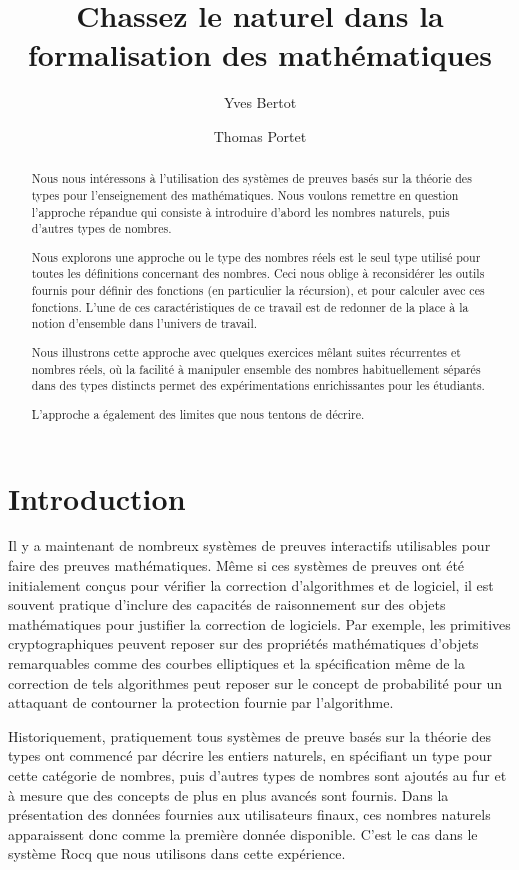 \documentclass[draft]{jflart}
\title{Chassez le naturel dans la formalisation des mathématiques}
\author[1]{Yves Bertot}
\author[1]{Thomas Portet}
\affil[1]{Centre Inria de l'Université Côte d'Azur, France}
\begin{document}
\maketitle

\begin{abstract}
  Nous nous intéressons à l'utilisation des systèmes de preuves basés sur la
  théorie des types pour l'enseignement des mathématiques.  Nous voulons
  remettre en question l'approche répandue qui consiste à introduire
  d'abord les nombres naturels, puis d'autres types de nombres.

  Nous explorons une approche ou le type des nombres réels est le seul type
  utilisé pour toutes les définitions concernant des nombres.  Ceci nous oblige
  à reconsidérer les outils fournis pour définir des fonctions (en particulier
  la récursion), et pour calculer avec ces fonctions.
  L'une de ces caractéristiques de ce travail est de redonner de la place à
  la notion d'ensemble dans l'univers de travail.

  Nous illustrons cette approche avec quelques exercices mêlant suites
  récurrentes et nombres réels, où la facilité à manipuler ensemble des nombres
  habituellement séparés dans des types distincts permet des expérimentations
  enrichissantes pour les étudiants.

  L'approche a également des limites que nous tentons de décrire.
\end{abstract}

\section{Introduction}

Il y a maintenant de nombreux systèmes de preuves interactifs
utilisables pour faire des preuves mathématiques.  Même si ces
systèmes de preuves ont été initialement conçus pour vérifier la
correction d'algorithmes et de logiciel, il est souvent pratique
d'inclure des capacités de raisonnement sur des objets mathématiques
pour justifier la correction de logiciels.  Par exemple, les
primitives cryptographiques peuvent reposer sur des propriétés
mathématiques d'objets remarquables comme des courbes elliptiques et
la spécification même de la correction de tels algorithmes peut
reposer sur le concept de probabilité pour un attaquant de contourner
la protection fournie par l'algorithme.

Historiquement, pratiquement tous systèmes de preuve basés sur la
théorie des types ont commencé
par décrire les entiers naturels, en spécifiant un type pour cette
catégorie de nombres, puis d'autres types de nombres sont ajoutés au
fur et à mesure que des concepts de plus en plus avancés sont fournis.
Dans la présentation des données fournies aux utilisateurs finaux, ces
nombres naturels apparaissent donc comme la première donnée
disponible.  C'est le cas dans le système Rocq
\cite{the_coq_development_team_2024_11551307} que nous utilisons dans
cette expérience.
\end{document}
